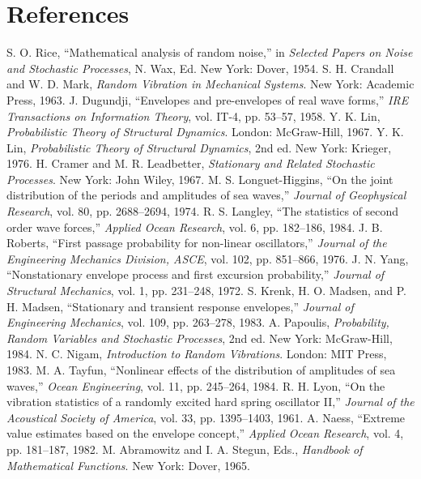 \documentclass[12pt]{article}
\theoremstyle{plain}
\theoremstyle{definition}
\theoremstyle{remark}
\theoremstyle{plain}
\theoremstyle{definition}
\begin{document}
\section*{References}
\begin{thebibliography}{99}
 S. O. Rice, ``Mathematical analysis of random noise,'' in \emph{Selected Papers on Noise and Stochastic Processes}, N. Wax, Ed. New York: Dover, 1954.
 S. H. Crandall and W. D. Mark, \emph{Random Vibration in Mechanical Systems}. New York: Academic Press, 1963.
 J. Dugundji, ``Envelopes and pre-envelopes of real wave forms,'' \emph{IRE Transactions on Information Theory}, vol. IT-4, pp. 53--57, 1958.
 Y. K. Lin, \emph{Probabilistic Theory of Structural Dynamics}. London: McGraw-Hill, 1967.
 Y. K. Lin, \emph{Probabilistic Theory of Structural Dynamics}, 2nd ed. New York: Krieger, 1976.
 H. Cramer and M. R. Leadbetter, \emph{Stationary and Related Stochastic Processes}. New York: John Wiley, 1967.
 M. S. Longuet-Higgins, ``On the joint distribution of the periods and amplitudes of sea waves,'' \emph{Journal of Geophysical Research}, vol. 80, pp. 2688--2694, 1974.
 R. S. Langley, ``The statistics of second order wave forces,'' \emph{Applied Ocean Research}, vol. 6, pp. 182--186, 1984.
 J. B. Roberts, ``First passage probability for non-linear oscillators,'' \emph{Journal of the Engineering Mechanics Division, ASCE}, vol. 102, pp. 851--866, 1976.
 J. N. Yang, ``Nonstationary envelope process and first excursion probability,'' \emph{Journal of Structural Mechanics}, vol. 1, pp. 231--248, 1972.
 S. Krenk, H. O. Madsen, and P. H. Madsen, ``Stationary and transient response envelopes,'' \emph{Journal of Engineering Mechanics}, vol. 109, pp. 263--278, 1983.
 A. Papoulis, \emph{Probability, Random Variables and Stochastic Processes}, 2nd ed. New York: McGraw-Hill, 1984.
 N. C. Nigam, \emph{Introduction to Random Vibrations}. London: MIT Press, 1983.
 M. A. Tayfun, ``Nonlinear effects of the distribution of amplitudes of sea waves,'' \emph{Ocean Engineering}, vol. 11, pp. 245--264, 1984.
 R. H. Lyon, ``On the vibration statistics of a randomly excited hard spring oscillator II,'' \emph{Journal of the Acoustical Society of America}, vol. 33, pp. 1395--1403, 1961.
 A. Naess, ``Extreme value estimates based on the envelope concept,'' \emph{Applied Ocean Research}, vol. 4, pp. 181--187, 1982.
 M. Abramowitz and I. A. Stegun, Eds., \emph{Handbook of Mathematical Functions}. New York: Dover, 1965.
\end{thebibliography}
\end{document}

